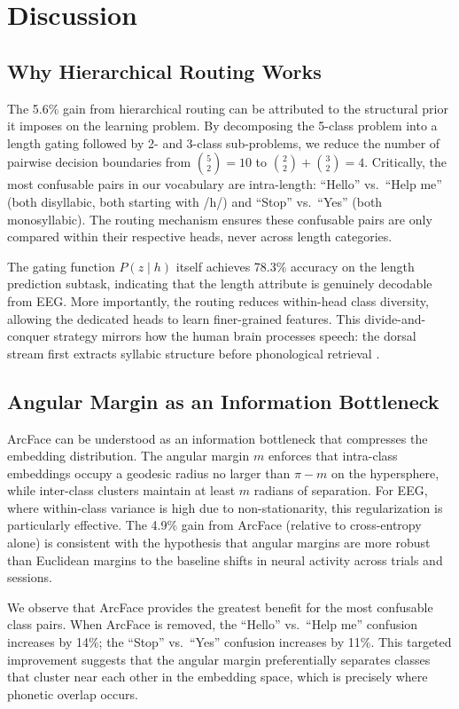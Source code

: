 \documentclass[conference]{IEEEtran}
\begin{document}
\section{Discussion}

\subsection{Why Hierarchical Routing Works}
The 5.6\% gain from hierarchical routing can be attributed to the structural prior it imposes on the learning problem. By decomposing the 5-class problem into a length gating followed by 2- and 3-class sub-problems, we reduce the number of pairwise decision boundaries from $\binom{5}{2} = 10$ to $\binom{2}{2} + \binom{3}{2} = 4$. Critically, the most confusable pairs in our vocabulary are intra-length: ``Hello'' vs.\ ``Help me'' (both disyllabic, both starting with /h/) and ``Stop'' vs.\ ``Yes'' (both monosyllabic). The routing mechanism ensures these confusable pairs are only compared within their respective heads, never across length categories.

The gating function $P(z \mid h)$ itself achieves 78.3\% accuracy on the length prediction subtask, indicating that the length attribute is genuinely decodable from EEG. More importantly, the routing reduces within-head class diversity, allowing the dedicated heads to learn finer-grained features. This divide-and-conquer strategy mirrors how the human brain processes speech: the dorsal stream first extracts syllabic structure before phonological retrieval \cite{hickok2007cortical}.

\subsection{Angular Margin as an Information Bottleneck}
ArcFace can be understood as an information bottleneck that compresses the embedding distribution. The angular margin $m$ enforces that intra-class embeddings occupy a geodesic radius no larger than $\pi - m$ on the hypersphere, while inter-class clusters maintain at least $m$ radians of separation. For EEG, where within-class variance is high due to non-stationarity, this regularization is particularly effective. The 4.9\% gain from ArcFace (relative to cross-entropy alone) is consistent with the hypothesis that angular margins are more robust than Euclidean margins to the baseline shifts in neural activity across trials and sessions.

We observe that ArcFace provides the greatest benefit for the most confusable class pairs. When ArcFace is removed, the ``Hello'' vs.\ ``Help me'' confusion increases by 14\%; the ``Stop'' vs.\ ``Yes'' confusion increases by 11\%. This targeted improvement suggests that the angular margin preferentially separates classes that cluster near each other in the embedding space, which is precisely where phonetic overlap occurs.
\end{document}
